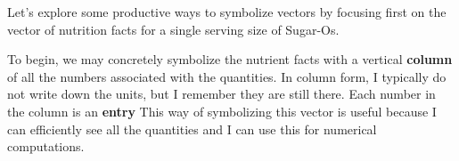 \newpage
{} %

Let's explore some productive ways to symbolize vectors by focusing first on the vector of nutrition facts for a single serving size of Sugar-Os.

To begin, we may concretely symbolize the nutrient facts with a vertical \textbf{column} of all the numbers associated with the quantities.
%
%
In column form, I typically do not write down the units, but I remember they are still there.  
Each number in the column is an \textbf{entry}
This way of symbolizing this vector is useful because I can efficiently see all the quantities and I can use this for numerical computations.  
%

